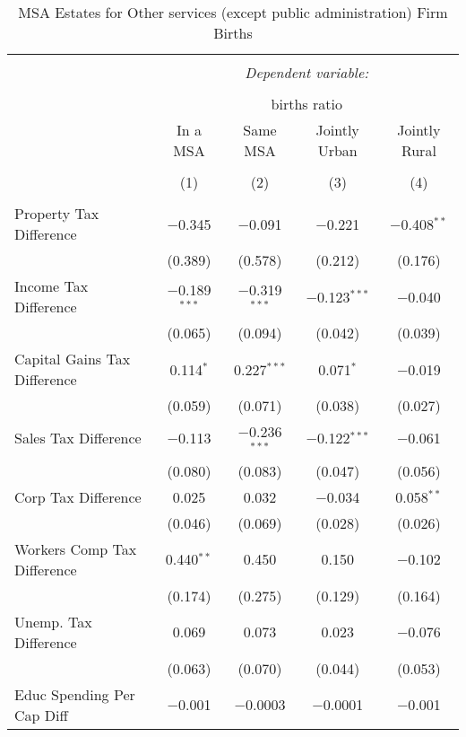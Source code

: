 
\begin{table}[!htbp] \centering 
  \caption{MSA Estates for  Other services (except public administration) Firm Births} 
  \label{81metro} 
\begin{tabular}{@{\extracolsep{5pt}}lcccc} 
\\[-1.8ex]\hline 
\hline \\[-1.8ex] 
 & \multicolumn{4}{c}{\textit{Dependent variable:}} \\ 
\cline{2-5} 
\\[-1.8ex] & \multicolumn{4}{c}{births ratio} \\ 
 & In a MSA & Same MSA & Jointly Urban & Jointly Rural \\ 
\\[-1.8ex] & (1) & (2) & (3) & (4)\\ 
\hline \\[-1.8ex] 
 Property Tax Difference & $-$0.345 & $-$0.091 & $-$0.221 & $-$0.408$^{**}$ \\ 
  & (0.389) & (0.578) & (0.212) & (0.176) \\ 
  Income Tax Difference & $-$0.189$^{***}$ & $-$0.319$^{***}$ & $-$0.123$^{***}$ & $-$0.040 \\ 
  & (0.065) & (0.094) & (0.042) & (0.039) \\ 
  Capital Gains Tax Difference & 0.114$^{*}$ & 0.227$^{***}$ & 0.071$^{*}$ & $-$0.019 \\ 
  & (0.059) & (0.071) & (0.038) & (0.027) \\ 
  Sales Tax Difference & $-$0.113 & $-$0.236$^{***}$ & $-$0.122$^{***}$ & $-$0.061 \\ 
  & (0.080) & (0.083) & (0.047) & (0.056) \\ 
  Corp Tax Difference & 0.025 & 0.032 & $-$0.034 & 0.058$^{**}$ \\ 
  & (0.046) & (0.069) & (0.028) & (0.026) \\ 
  Workers Comp Tax Difference & 0.440$^{**}$ & 0.450 & 0.150 & $-$0.102 \\ 
  & (0.174) & (0.275) & (0.129) & (0.164) \\ 
  Unemp. Tax Difference & 0.069 & 0.073 & 0.023 & $-$0.076 \\ 
  & (0.063) & (0.070) & (0.044) & (0.053) \\ 
  Educ Spending Per Cap Diff & $-$0.001 & $-$0.0003 & $-$0.0001 & $-$0.001 \\ 

\end{tabular}
\end{table}
